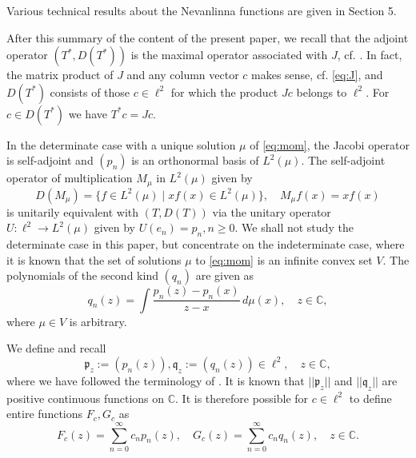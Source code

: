\documentclass [12pt]{article}
\newcommand{\C}{\mathbb{C}}
\begin{document}
 Various technical  results about the Nevanlinna functions are given in Section 5.
 
After this summary of the content of the present paper, we recall that the adjoint operator $(T^*,D(T^*))$ is the maximal operator associated with $J$, cf. \cite[Proposition 6.5]{Sch}. In fact, the matrix product of $J$  and any column vector $c$ makes sense, cf. \eqref{eq:J}, and $D(T^*)$ consists of those $c\in\ell^2$ for which the product $Jc$ belongs to $\ell^2$. For $c\in D(T^*)$ we have $T^*c=Jc$.
 
In the determinate case with a unique solution $\mu$ of \eqref{eq:mom}, the Jacobi operator is self-adjoint and $(p_n)$ is an orthonormal basis of $L^2(\mu)$. The self-adjoint operator of multiplication $M_\mu$ in $L^2(\mu)$ given by 
$$
D(M_\mu)=\{f\in L^2(\mu)\mid xf(x)\in L^2(\mu)\},\quad M_\mu f(x)=xf(x)
$$
is unitarily equivalent with $(T, D(T))$ via the unitary operator $U:\ell^2\to L^2(\mu)$ given by $U(e_n)=p_n, n\ge 0$. We shall not study the determinate case in this paper, but concentrate on the  indeterminate case, where it is known that  the set of solutions $\mu$ to \eqref{eq:mom} is an infinite convex set $V$. The polynomials of the second kind $(q_n)$ are given as
\begin{equation*}
q_n(z)=\int \frac{p_n(z)-p_n(x)}{z-x}\,d\mu(x), \quad z\in \C,
\end{equation*}
where $\mu\in V$ is arbitrary.

We define  and recall
\begin{equation}\label{eq:frak}
 \mathfrak{p}_z:=(p_n(z)), \mathfrak{q}_z:=(q_n(z))\in\ell^2,\quad z\in\C,
 \end{equation}
 where we have followed the terminology of \cite{Sch}. It is known that
   $||\mathfrak{p}_z||$ and $||\mathfrak{q}_z||$ are positive continuous functions on $\C$.  It is therefore possible 
for $c\in\ell^2$ to define entire functions $F_c, G_c$ as
\begin{equation}\label{eq:FGc}
F_c(z)=\sum_{n=0}^\infty c_np_n(z),\quad G_c(z)=\sum_{n=0}^\infty c_nq_n(z),\quad z\in\C.
\end{equation}
\end{document}
